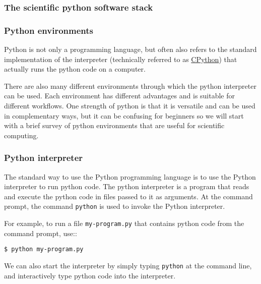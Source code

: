 \documentclass[11pt]{article}
\begin{document}
    \hypertarget{the-scientific-python-software-stack}{%
\subsubsection{The scientific python software
stack}\label{the-scientific-python-software-stack}}

    

    \hypertarget{python-environments}{%
\subsubsection{Python environments}\label{python-environments}}

    Python is not only a programming language, but often also refers to the
standard implementation of the interpreter (technically referred to as
\href{http://en.wikipedia.org/wiki/CPython}{CPython}) that actually runs
the python code on a computer.

There are also many different environments through which the python
interpreter can be used. Each environment has different advantages and
is suitable for different workflows. One strength of python is that it
is versatile and can be used in complementary ways, but it can be
confusing for beginners so we will start with a brief survey of python
environments that are useful for scientific computing.

    \hypertarget{python-interpreter}{%
\subsubsection{Python interpreter}\label{python-interpreter}}

    The standard way to use the Python programming language is to use the
Python interpreter to run python code. The python interpreter is a
program that reads and execute the python code in files passed to it as
arguments. At the command prompt, the command \texttt{python} is used to
invoke the Python interpreter.

For example, to run a file \texttt{my-program.py} that contains python
code from the command prompt, use::

\begin{verbatim}
$ python my-program.py
\end{verbatim}

We can also start the interpreter by simply typing \texttt{python} at
the command line, and interactively type python code into the
interpreter.
\end{document}
